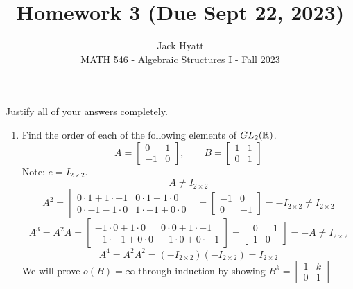 \documentclass[12pt]{article}
\begin{document}
	
	
	
	\title{Homework 3 (Due Sept 22, 2023)}
	\author{Jack Hyatt\\ %
		MATH 546 - Algebraic Structures I - Fall 2023} 
	
	\maketitle
	
	Justify all of your answers completely.\\
	
	
	\medskip 
	
	\begin{enumerate}
		\item Find the order of each of the following elements of $GL_2(\mathbb{R})$.
		\[A = \begin{bmatrix}
			0 & 1 \\
			-1 & 0
		\end{bmatrix},\qquad B = \begin{bmatrix}
		1 & 1\\
		0 & 1
	\end{bmatrix}\]
	Note: $e = I_{2\times2}$.\\
	\[A \neq I_{2\times2}\]
	\[A^2 = \begin{bmatrix}
		0\cdot1+1\cdot-1 & 0\cdot1+1\cdot0 \\
		0\cdot-1-1\cdot0 & 1\cdot-1+0\cdot0
	\end{bmatrix} = \begin{bmatrix}
	-1 & 0 \\
	0 & -1
	\end{bmatrix} = -I_{2\times2} \neq I_{2\times2}\]
	\[A^3 = A^2A = \begin{bmatrix}
		-1\cdot0+1\cdot0 & 0\cdot0+1\cdot-1 \\
		-1\cdot-1+0\cdot0 & -1\cdot0+0\cdot-1
	\end{bmatrix} = \begin{bmatrix}
		0 & -1 \\
		1 & 0
	\end{bmatrix} = -A \neq I_{2\times2}\]
	\[A^4 = A^2A^2 = (-I_{2\times2})(-I_{2\times2}) = I_{2\times2}\]
	We will prove $o(B) = \infty$ through induction by showing $B^k = \begin{bmatrix}
		1 & k\\
		0 & 1
	\end{bmatrix}$

\end{enumerate}
\end{document}
